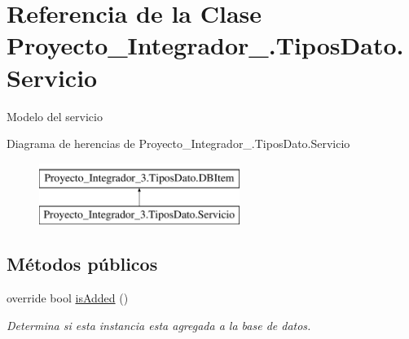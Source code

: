 \hypertarget{class_proyecto___integrador__3_1_1_tipos_dato_1_1_servicio}{\section{Referencia de la Clase Proyecto\-\_\-\-Integrador\-\_.\-Tipos\-Dato.\-Servicio}
\label{class_proyecto___integrador__3_1_1_tipos_dato_1_1_servicio}
}


Modelo del servicio  


Diagrama de herencias de Proyecto\-\_\-\-Integrador\-\_.\-Tipos\-Dato.\-Servicio\begin{figure}[H]
\begin{center}
\leavevmode
\includegraphics[height=2.000000cm]{da/de4/class_proyecto___integrador__3_1_1_tipos_dato_1_1_servicio}
\end{center}
\end{figure}
\subsection*{Métodos públicos}
\begin{DoxyCompactItemize}
\item 
override bool \hyperlink{class_proyecto___integrador__3_1_1_tipos_dato_1_1_servicio_a84ccd70aa17d65df0afff55a14faeeec}{is\-Added} ()
\begin{DoxyCompactList}\small\item\em Determina si esta instancia esta agregada a la base de datos. \end{DoxyCompactList}\end{DoxyCompactItemize}
